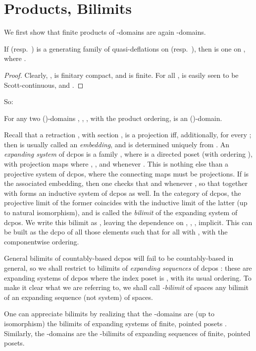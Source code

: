 \documentclass{LMCS}
\begin{document}
\section{Products, Bilimits}
\label{sec:bilim}

We first show that finite products of -domains are again
-domains.
\begin{lem}
  \label{lem:qrb:prod}
  If  (resp.\ ) is a
  generating family of quasi-deflations on  (resp.\ ), then
   is one on , where
  .
\end{lem}
\begin{proof}
Clearly, ,  is finitary
  compact, and  is finite.  For all ,
   is easily seen to be Scott-continuous, and .
\end{proof}
So:
\begin{lem}
  \label{lemma:qrb:prod}
  For any two ()-domains , , , with
  the product ordering, is an ()-domain.
\end{lem}

Recall that a retraction , with section , is
a projection iff, additionally,  for every ; then  is usually called an {\em embedding\/}, and is determined
uniquely from .  An \emph{expanding system} of dcpos is a family
, where  is a directed poset (with ordering
), with projection maps  where
, , and  whenever 
\cite[Section~3.3.2]{AJ:domains}. This is nothing else than a
projective system of dcpos, where the connecting maps  must be
projections.  If  is the associated embedding,
then one checks that  and  whenever , so that 
together with  forms an inductive
system of dcpos as well.  In the category of dcpos, the projective
limit of the former coincides with the inductive limit of the latter
(up to natural isomorphism), and is called the \emph{bilimit} of the
expanding system of dcpos.  We write this bilimit as , leaving the dependence on , , , implicit.
This can be built as the dcpo of all those elements  such that  for all  with , with the componentwise
ordering.

General bilimits of countably-based dcpos will fail to be
countably-based in general, so we shall restrict to bilimits of
\emph{expanding sequences} of dcpos
\cite[Definition~3.3.6]{AJ:domains}: these are expanding systems of
dcpos where the index poset  is , with its usual ordering.
To make it clear what we are referring to, we shall call
\emph{-bilimit} of spaces any bilimit of an expanding sequence
(not system) of spaces.

One can appreciate bilimits by realizing that the -domains are (up
to isomorphism) the bilimits of expanding systems of finite, pointed
posets \cite[Theorem~4.2.7]{AJ:domains}.  Similarly, the
-domains are the -bilimits of expanding sequences of
finite, pointed posets.
\end{document}
